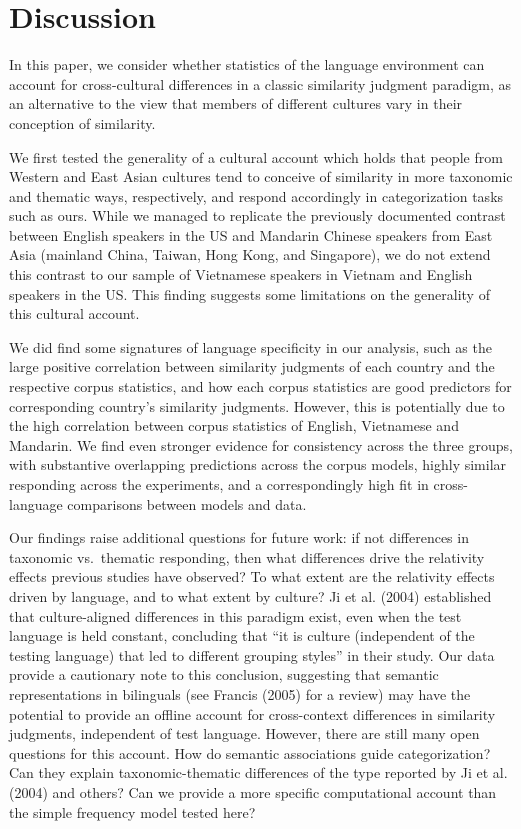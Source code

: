 \documentclass[10pt, letterpaper]{article}
\begin{document}
\hypertarget{discussion}{%
\section{Discussion}\label{discussion}}

In this paper, we consider whether statistics of the language
environment can account for cross-cultural differences in a classic
similarity judgment paradigm, as an alternative to the view that members
of different cultures vary in their conception of similarity.

We first tested the generality of a cultural account which holds that
people from Western and East Asian cultures tend to conceive of
similarity in more taxonomic and thematic ways, respectively, and
respond accordingly in categorization tasks such as ours. While we
managed to replicate the previously documented contrast between English
speakers in the US and Mandarin Chinese speakers from East Asia
(mainland China, Taiwan, Hong Kong, and Singapore), we do not extend
this contrast to our sample of Vietnamese speakers in Vietnam and
English speakers in the US. This finding suggests some limitations on
the generality of this cultural account.

We did find some signatures of language specificity in our analysis,
such as the large positive correlation between similarity judgments of
each country and the respective corpus statistics, and how each corpus
statistics are good predictors for corresponding country's similarity
judgments. However, this is potentially due to the high correlation
between corpus statistics of English, Vietnamese and Mandarin. We find
even stronger evidence for consistency across the three groups, with
substantive overlapping predictions across the corpus models, highly
similar responding across the experiments, and a correspondingly high
fit in cross-language comparisons between models and data.

Our findings raise additional questions for future work: if not
differences in taxonomic vs.~thematic responding, then what differences
drive the relativity effects previous studies have observed? To what
extent are the relativity effects driven by language, and to what extent
by culture? Ji et al. (2004) established that culture-aligned
differences in this paradigm exist, even when the test language is held
constant, concluding that ``it is culture (independent of the testing
language) that led to different grouping styles'' in their study. Our
data provide a cautionary note to this conclusion, suggesting that
semantic representations in bilinguals (see Francis (2005) for a review)
may have the potential to provide an offline account for cross-context
differences in similarity judgments, independent of test language.
However, there are still many open questions for this account. How do
semantic associations guide categorization? Can they explain
taxonomic-thematic differences of the type reported by Ji et al. (2004)
and others? Can we provide a more specific computational account than
the simple frequency model tested here?
\end{document}

